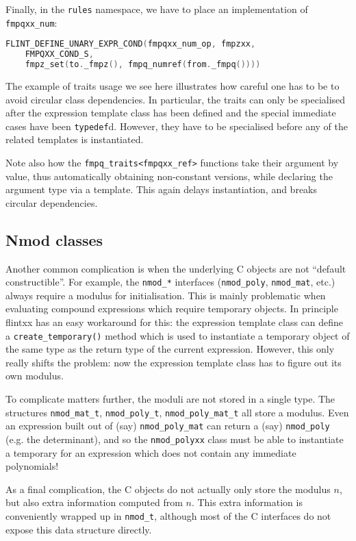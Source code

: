 \documentclass[a4paper,10pt]{book}
\newcommand{\code}{\lstinline}
\begin{document}
{{Finally, in the \code{rules} namespace, we have to place an implementation of
\code{fmpqxx_num}:

\begin{lstlisting}[language=c++]
FLINT_DEFINE_UNARY_EXPR_COND(fmpqxx_num_op, fmpzxx,
    FMPQXX_COND_S,
    fmpz_set(to._fmpz(), fmpq_numref(from._fmpq())))
\end{lstlisting}

The example of traits usage we see here illustrates how careful one has to be to
avoid circular class dependencies. In particular, the traits can only be
specialised after the expression template class has been defined and the special
immediate cases have been \code{typedef}d. However, they have to be specialised
before any of the related templates is instantiated.

Note also how the \code{fmpq_traits<fmpqxx_ref>} functions take their argument
by value, thus automatically obtaining non-constant versions, while declaring
the argument type via a template. This again delays instantiation, and breaks
circular dependencies.

\subsection{Nmod classes}

Another common complication is when the underlying C objects are not ``default
constructible''. For example, the \code{nmod_*} interfaces (\code{nmod_poly},
\code{nmod_mat}, etc.) always require a modulus for initialisation. This is
mainly problematic when evaluating compound expressions which require temporary
objects. In principle flintxx has an easy workaround for this: the expression
template class can define a \code{create_temporary()} method which is used to
instantiate a temporary object of the same type as the return type of the
current expression. However, this only really shifts the problem: now the
expression template class has to figure out its own modulus.

To complicate matters further, the moduli are not stored in a single type. The
structures \code{nmod_mat_t}, \code{nmod_poly_t}, \code{nmod_poly_mat_t} all
store a modulus. Even an expression built out of (say) \code{nmod_poly_mat} can
return a (say) \code{nmod_poly} (e.g. the determinant), and so the
\code{nmod_polyxx} class must be able to instantiate a temporary for an
expression which does not contain any immediate polynomials!

As a final complication, the C objects do not actually only store the modulus
$n$, but also extra information computed from $n$. This extra information is
conveniently wrapped up in \code{nmod_t}, although most of the C interfaces do
not expose this data structure directly.

}}
\end{document}
